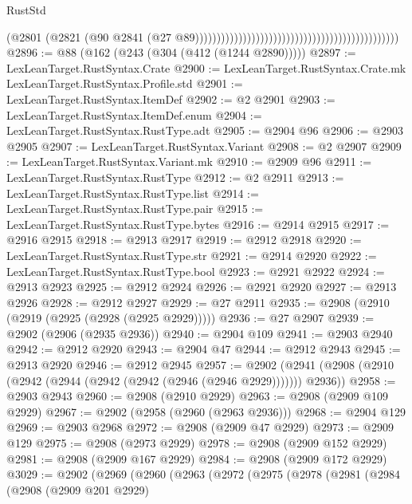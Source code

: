 \begin{lexlean}{RustStd}
\begin{coremodule}
                                                                                          (@2801
                                                                                            (@2821
                                                                                              (@90
                                                                                                @2841
                                                                                                (@27
                                                                                                  @89)))))))))))))))))))))))))))))))))))))))))))))))
@2896 := @88 (@162 (@243 (@304 (@412 (@1244 @2890)))))
@2897 := LexLeanTarget.RustSyntax.Crate
@2900 := LexLeanTarget.RustSyntax.Crate.mk LexLeanTarget.RustSyntax.Profile.std
@2901 := LexLeanTarget.RustSyntax.ItemDef
@2902 := @2 @2901
@2903 := LexLeanTarget.RustSyntax.ItemDef.enum
@2904 := LexLeanTarget.RustSyntax.RustType.adt
@2905 := @2904 @96
@2906 := @2903 @2905
@2907 := LexLeanTarget.RustSyntax.Variant
@2908 := @2 @2907
@2909 := LexLeanTarget.RustSyntax.Variant.mk
@2910 := @2909 @96
@2911 := LexLeanTarget.RustSyntax.RustType
@2912 := @2 @2911
@2913 := LexLeanTarget.RustSyntax.RustType.list
@2914 := LexLeanTarget.RustSyntax.RustType.pair
@2915 := LexLeanTarget.RustSyntax.RustType.bytes
@2916 := @2914 @2915
@2917 := @2916 @2915
@2918 := @2913 @2917
@2919 := @2912 @2918
@2920 := LexLeanTarget.RustSyntax.RustType.str
@2921 := @2914 @2920
@2922 := LexLeanTarget.RustSyntax.RustType.bool
@2923 := @2921 @2922
@2924 := @2913 @2923
@2925 := @2912 @2924
@2926 := @2921 @2920
@2927 := @2913 @2926
@2928 := @2912 @2927
@2929 := @27 @2911
@2935 := @2908 (@2910 (@2919 (@2925 (@2928 (@2925 @2929)))))
@2936 := @27 @2907
@2939 := @2902 (@2906 (@2935 @2936))
@2940 := @2904 @109
@2941 := @2903 @2940
@2942 := @2912 @2920
@2943 := @2904 @47
@2944 := @2912 @2943
@2945 := @2913 @2920
@2946 := @2912 @2945
@2957 := @2902 (@2941 (@2908 (@2910 (@2942 (@2944 (@2942 (@2942 (@2946 (@2946 @2929))))))) @2936))
@2958 := @2903 @2943
@2960 := @2908 (@2910 @2929)
@2963 := @2908 (@2909 @109 @2929)
@2967 := @2902 (@2958 (@2960 (@2963 @2936)))
@2968 := @2904 @129
@2969 := @2903 @2968
@2972 := @2908 (@2909 @47 @2929)
@2973 := @2909 @129
@2975 := @2908 (@2973 @2929)
@2978 := @2908 (@2909 @152 @2929)
@2981 := @2908 (@2909 @167 @2929)
@2984 := @2908 (@2909 @172 @2929)
@3029 := @2902
    (@2969
      (@2960
        (@2963
          (@2972
            (@2975
              (@2978
                (@2981
                  (@2984
                    (@2908
                      (@2909 @201 @2929)

\end{coremodule}
\end{lexlean}
